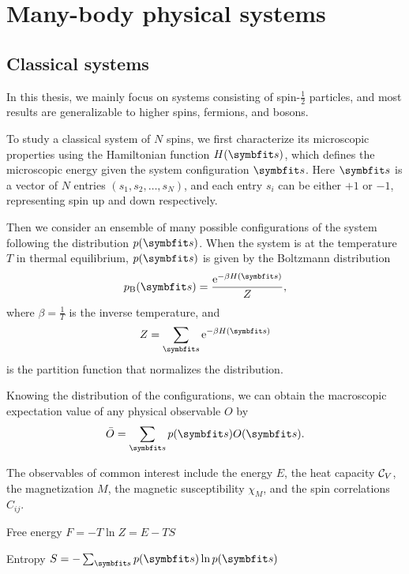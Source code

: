 \chapter{Many-body physical systems}


\section{Classical systems}

In this thesis, we mainly focus on systems consisting of spin-$\frac{1}{2}$ particles, and most results are generalizable to higher spins, fermions, and bosons.

To study a classical system of $N$ spins, we first characterize its microscopic properties using the Hamiltonian function $H(\vs)$, which defines the microscopic energy given the system configuration $\vs$. Here $\vs$ is a vector of $N$ entries $(s_1, s_2, \ldots, s_N)$, and each entry $s_i$ can be either $+1$ or $-1$, representing spin up and down respectively.

Then we consider an ensemble of many possible configurations of the system following the distribution $p(\vs)$. When the system is at the temperature $T$ in thermal equilibrium, $p(\vs)$ is given by the Boltzmann distribution
\begin{equation}
p_\text{B}(\vs) = \frac{\rme^{-\beta H(\vs)}}{Z},
\label{eq:boltzmann}
\end{equation}
where $\beta = \frac{1}{T}$ is the inverse temperature, and
\begin{equation}
Z = \sum_\vs \rme^{-\beta H(\vs)}
\end{equation}
is the partition function that normalizes the distribution.

Knowing the distribution of the configurations, we can obtain the macroscopic expectation value of any physical observable $O$ by
\begin{equation}
\bar{O} = \sum_\vs p(\vs) O(\vs).
\label{eq:cl-obs}
\end{equation}

The observables of common interest include the energy $E$, the heat capacity $\mathcal{C}_V$, the magnetization $M$, the magnetic susceptibility $\chi_M$, and the spin correlations $C_{i j}$.

Free energy $F = -T \ln Z = E - T S$

Entropy $S = -\sum_\vs p(\vs) \ln p(\vs)$


